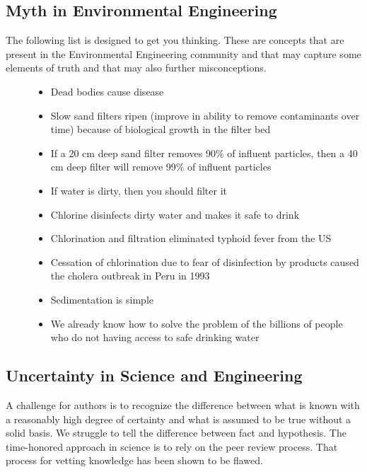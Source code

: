 \documentclass[letterpaper,10pt,english]{sphinxmanual}
\begin{document}
\subsection{Myth in Environmental Engineering}
\label{\detokenize{Introduction/Introduction:myth-in-environmental-engineering}}\label{\detokenize{Introduction/Introduction:heading-myth-in-environmental-engineering}}\begin{description}
\item[{The following list is designed to get you thinking. These are concepts that are present in the Environmental Engineering community and that may capture some elements of truth and that may also further misconceptions.}] \leavevmode\begin{itemize}
\item {} 
Dead bodies cause disease

\item {} 
Slow sand filters ripen (improve in ability to remove contaminants over time) because of biological growth in the filter bed

\item {} 
If a 20 cm deep sand filter removes 90\% of influent particles, then a 40 cm deep filter will remove 99\% of influent particles

\item {} 
If water is dirty, then you should filter it

\item {} 
Chlorine disinfects dirty water and makes it safe to drink

\item {} 
Chlorination and filtration eliminated typhoid fever from the US

\item {} 
Cessation of chlorination due to fear of disinfection by products caused the cholera outbreak in Peru in 1993

\item {} 
Sedimentation is simple

\item {} 
We already know how to solve the problem of the billions of people who do not having access to safe drinking water

\end{itemize}

\end{description}


\subsection{Uncertainty in Science and Engineering}
\label{\detokenize{Introduction/Introduction:uncertainty-in-science-and-engineering}}\label{\detokenize{Introduction/Introduction:heading-uncertainty-in-science-and-engineering}}
A challenge for authors is to recognize the difference between what is known with a reasonably high degree of certainty and what is assumed to be true without a solid basis. We struggle to tell the difference between fact and hypothesis. The time-honored approach in science is to rely on the peer review process. That process for vetting knowledge has been shown to be flawed.
\end{document}
